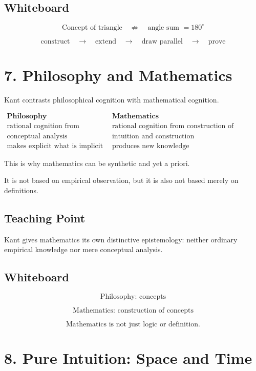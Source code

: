 \documentclass[11pt]{article}
\begin{document}
\subsection*{Whiteboard}

\[
\text{Concept of triangle}
\quad
\not\Rightarrow
\quad
\text{angle sum } = 180^\circ
\]

\[
\text{construct}
\quad \rightarrow \quad
\text{extend}
\quad \rightarrow \quad
\text{draw parallel}
\quad \rightarrow \quad
\text{prove}
\]

\section*{7. Philosophy and Mathematics}

Kant contrasts philosophical cognition with mathematical cognition.

\[
\begin{array}{c|c}
\textbf{Philosophy} & \textbf{Mathematics} \\
\hline
\text{rational cognition from concepts} &
\text{rational cognition from construction of concepts} \\
\text{conceptual analysis} &
\text{intuition and construction} \\
\text{makes explicit what is implicit} &
\text{produces new knowledge}
\end{array}
\]

This is why mathematics can be synthetic and yet a priori.

It is not based on empirical observation, but it is also not based merely on definitions.

\subsection*{Teaching Point}

Kant gives mathematics its own distinctive epistemology: neither ordinary empirical
knowledge nor mere conceptual analysis.

\subsection*{Whiteboard}

\[
\text{Philosophy: concepts}
\]

\[
\text{Mathematics: construction of concepts}
\]

\[
\text{Mathematics is not just logic or definition.}
\]

\section*{8. Pure Intuition: Space and Time}
\end{document}
